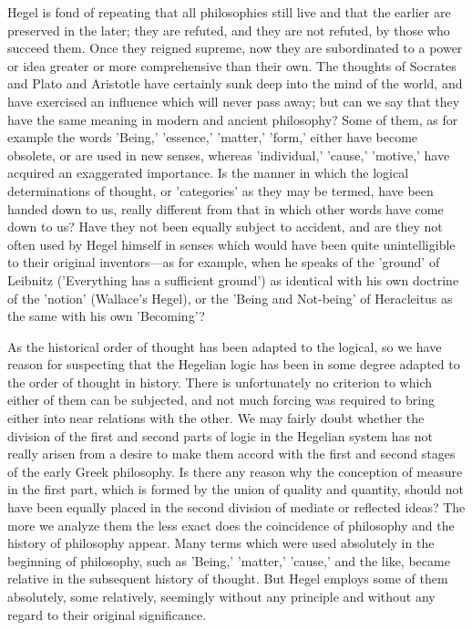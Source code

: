 \documentclass[11pt,letter]{article}
\begin{document}
\par  Hegel is fond of repeating that all philosophies still live and that the earlier are preserved in the later; they are refuted, and they are not refuted, by those who succeed them. Once they reigned supreme, now they are subordinated to a power or idea greater or more comprehensive than their own. The thoughts of Socrates and Plato and Aristotle have certainly sunk deep into the mind of the world, and have exercised an influence which will never pass away; but can we say that they have the same meaning in modern and ancient philosophy? Some of them, as for example the words 'Being,' 'essence,' 'matter,' 'form,' either have become obsolete, or are used in new senses, whereas 'individual,' 'cause,' 'motive,' have acquired an exaggerated importance. Is the manner in which the logical determinations of thought, or 'categories' as they may be termed, have been handed down to us, really different from that in which other words have come down to us? Have they not been equally subject to accident, and are they not often used by Hegel himself in senses which would have been quite unintelligible to their original inventors—as for example, when he speaks of the 'ground' of Leibnitz ('Everything has a sufficient ground') as identical with his own doctrine of the 'notion' (Wallace's Hegel), or the 'Being and Not-being' of Heracleitus as the same with his own 'Becoming'?

\par  As the historical order of thought has been adapted to the logical, so we have reason for suspecting that the Hegelian logic has been in some degree adapted to the order of thought in history. There is unfortunately no criterion to which either of them can be subjected, and not much forcing was required to bring either into near relations with the other. We may fairly doubt whether the division of the first and second parts of logic in the Hegelian system has not really arisen from a desire to make them accord with the first and second stages of the early Greek philosophy. Is there any reason why the conception of measure in the first part, which is formed by the union of quality and quantity, should not have been equally placed in the second division of mediate or reflected ideas? The more we analyze them the less exact does the coincidence of philosophy and the history of philosophy appear. Many terms which were used absolutely in the beginning of philosophy, such as 'Being,' 'matter,' 'cause,' and the like, became relative in the subsequent history of thought. But Hegel employs some of them absolutely, some relatively, seemingly without any principle and without any regard to their original significance.
\end{document}
